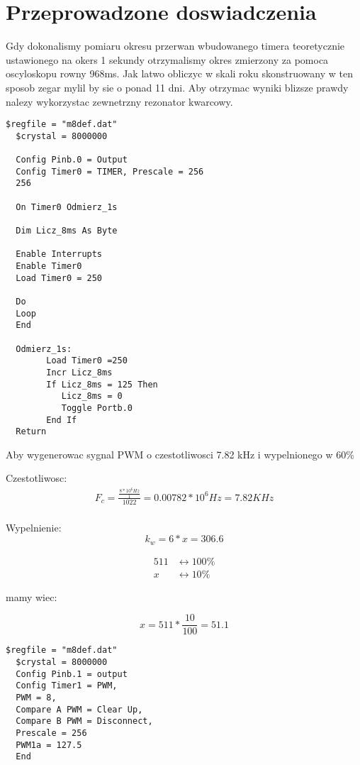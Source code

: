\documentclass{article}
\begin{document}
\section{Przeprowadzone doswiadczenia}

Gdy dokonalismy pomiaru okresu przerwan wbudowanego timera teoretycznie ustawionego 
na okers 1 sekundy otrzymalismy okres zmierzony za pomoca oscyloskopu rowny 
968ms. Jak latwo obliczyc w skali roku skonstruowany w ten sposob zegar mylil by sie o ponad 
11 dni. Aby otrzymac wyniki blizsze prawdy nalezy wykorzystac zewnetrzny rezonator kwarcowy.

\begin{lstlisting}[language=VBScript , caption=Program odmierzajacy 1s]
  $regfile = "m8def.dat"
  $crystal = 8000000	

  Config Pinb.0 = Output
  Config Timer0 = TIMER, Prescale = 256
  256
  
  On Timer0 Odmierz_1s
  
  Dim Licz_8ms As Byte
  
  Enable Interrupts
  Enable Timer0	
  Load Timer0 = 250
  
  Do
  Loop
  End
  
  Odmierz_1s:
        Load Timer0 =250
        Incr Licz_8ms
        If Licz_8ms = 125 Then
           Licz_8ms = 0
           Toggle Portb.0
        End If
  Return
\end{lstlisting}

Aby wygenerowac sygnal PWM o czestotliwosci 7.82 kHz i wypelnionego w 60\%

Czestotliwosc:
\begin{equation}
  \begin{split}
    F_c = \frac{\frac{8 * 10^6 Hz}{1}}{1022} = 0.00782 * 10^6 Hz = 7.82 KHz \\
  \end{split}
\end{equation}

Wypelnienie:
\begin{equation}
    k_w = 6 * x = 306.6
\end{equation}

\begin{equation}
  \begin{split}
    511 &\leftrightarrow 100\% \\
    x &\leftrightarrow 10\% 
  \end{split}
\end{equation}

mamy wiec:

\begin{equation}
  x = 511 * \frac{10}{100} = 51.1
\end{equation}


\begin{lstlisting}[language=VBScript , caption=Kod programu generujacego sygnal PWM]
  $regfile = "m8def.dat"
  $crystal = 8000000	
  Config Pinb.1 = output
  Config Timer1 = PWM,            
  PWM = 8, 
  Compare A PWM = Clear Up, 
  Compare B PWM = Disconnect, 
  Prescale = 256
  PWM1a = 127.5
  End
\end{lstlisting}
\end{document}

